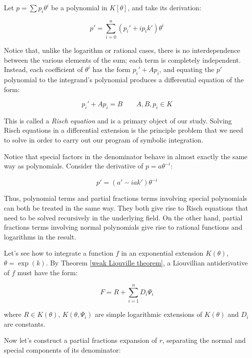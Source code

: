 \begin{comment}

t=tan x
t^2+1 = tan^2 x + 1 = sec^2 x
d(t^2+1) = 2tdt = 2 tan x sec^2 x

dt/dx = sec^2 x = (1 + tan^2 x)
Dt = t^2 + 1
D(t^2+1) = 2t(t^2+1)

\end{comment}

Let $p=\sum p_i \theta^i$ be a polynomial in $K[\theta]$,
and take its derivation:

$$p' = \sum_{i=0}^n (p_i' + i p_i k') \theta^i$$

Notice that, unlike the logarithm or rational cases, there is no
interdependence between the various elements of the sum; each term is
completely independent.  Instead, each coefficient of $\theta^i$ has
the form $p_i' + A p_i$, and equating the $p'$ polynomial to the
integrand's polynomial produces a differential equation of the form:

$$p_i' + A p_i = B \qquad A,B,p_i \in K$$

This is called a {\it Risch equation} and is a primary object of our
study.  Solving Risch equations in a differential extension is the
principle problem that we need to solve in order to carry out our
program of symbolic integration.

Notice that special factors in the denominator behave in almost
exactly the same way as polynomials.  Consider the derivative of
$p=a \theta^{-i}$:

$$p' = (a' - i a k') \theta^{-i}$$

Thus, polynomial terms and partial fractions terms involving special
polynomials can both be treated in the same way.  They both give rise
to Risch equations that need to be solved recursively in the underlying
field.  On the other hand, partial fractions terms involving
normal polynomials give rise to rational functions and logarithms
in the result.

Let's see how to integrate a function $f$ in an exponential extension
$K(\theta)$, $\theta = \exp(k)$.  By Theorem \ref{weak Liouville
theorem}, a Liouvillian antiderivative of $f$ must have the form:

$$F = R + \sum_{i=1}^n D_i \Psi_i$$

where $R \in K(\theta)$, $K(\theta, \Psi_i)$ are simple logarithmic
extensions of $K(\theta)$ and $D_i$ are constants.

Now let's construct a partial fractions expansion of $r$,
separating the normal and special components of its denominator:

